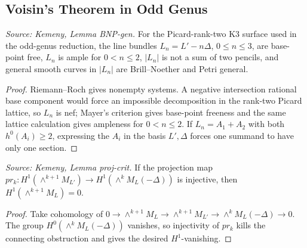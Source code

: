 \subsection{Voisin's Theorem in Odd Genus}

\begin{lemma}
  \label{lem:kemeny_BNP_gen}
  \textit{Source: Kemeny, Lemma BNP-gen.}
  For the Picard-rank-two K3 surface used in the odd-genus reduction, the line
  bundles \(L_n=L'-n\Delta\), \(0\le n\le3\), are base-point free, \(L_n\) is
  ample for \(0<n\le2\), \(|L_n|\) is not a sum of two pencils, and general
  smooth curves in \(|L_n|\) are Brill--Noether and Petri general.
\end{lemma}
\begin{proof}
  Riemann--Roch gives nonempty systems.  A negative intersection rational base
  component would force an impossible decomposition in the rank-two Picard
  lattice, so \(L_n\) is nef; Mayer's criterion gives base-point freeness and
  the same lattice calculation gives ampleness for \(0<n\le2\).  If
  \(L_n=A_1+A_2\) with both \(h^0(A_i)\ge2\), expressing the \(A_i\) in the
  basis \(L',\Delta\) forces one summand to have only one section.
\end{proof}

\begin{lemma}
  \label{lem:kemeny_projection_criterion}
  \textit{Source: Kemeny, Lemma proj-crit.}
  If the projection map
  \(pr_k:H^1(\wedge^{k+1}M_{L'})\to H^1(\wedge^kM_L(-\Delta))\) is injective,
  then \(H^1(\wedge^{k+1}M_L)=0\).
\end{lemma}
\begin{proof}
  Take cohomology of
  \(0\to\wedge^{k+1}M_L\to\wedge^{k+1}M_{L'}\to\wedge^kM_L(-\Delta)\to0\).
  The group \(H^0(\wedge^kM_L(-\Delta))\) vanishes, so injectivity of \(pr_k\)
  kills the connecting obstruction and gives the desired \(H^1\)-vanishing.
\end{proof}

